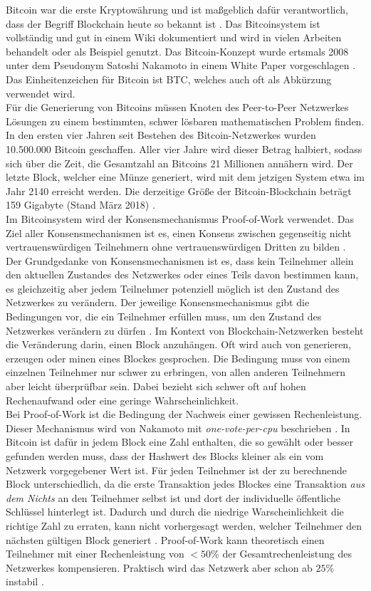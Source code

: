 		Bitcoin war die erste Kryptowährung und ist maßgeblich dafür verantwortlich, dass der Begriff Blockchain heute so bekannt ist \cite{BITB}. Das Bitcoinsystem ist vollständig und gut in einem Wiki \cite{BC-Wiki} dokumentiert und wird in vielen Arbeiten behandelt oder als Beispiel genutzt. 
		Das Bitcoin-Konzept wurde ertsmals 2008 unter dem Pseudonym Satoshi Nakamoto in einem White Paper vorgeschlagen \cite{BC}. Das Einheitenzeichen für Bitcoin ist BTC, welches auch oft als Abkürzung verwendet wird. \\
		Für die Generierung von Bitcoins müssen Knoten des Peer-to-Peer Netzwerkes Lösungen zu einem bestimmten, schwer lösbaren mathematischen Problem finden. In den ersten vier Jahren seit Bestehen des Bitcoin-Netzwerkes wurden 10.500.000 Bitcoin geschaffen. Aller vier Jahre wird dieser Betrag halbiert, sodass sich über die Zeit, die Gesamtzahl an Bitcoins 21 Millionen annähern wird. Der letzte Block, welcher eine Münze generiert, wird mit dem jetzigen System etwa im Jahr 2140 erreicht werden. Die derzeitige Größe der Bitcoin-Blockchain beträgt 159 Gigabyte (Stand März 2018) \cite{BCS} . \\
		Im Bitcoinsystem wird der Konsensmechanismus Proof-of-Work verwendet. Das Ziel aller Konsensmechanismen ist es, einen Konsens zwischen gegenseitig nicht vertrauenswürdigen Teilnehmern ohne vertrauenswürdigen Dritten zu bilden \cite{Block}. Der Grundgedanke von Konsensmechanismen ist es, dass kein Teilnehmer allein den aktuellen Zustandes des Netzwerkes oder eines Teils davon bestimmen kann, es gleichzeitig aber jedem Teilnehmer potenziell möglich ist den Zustand des Netzwerkes zu verändern. Der jeweilige Konsensmechanismus gibt die Bedingungen vor, die ein Teilnehmer erfüllen muss, um den Zustand des Netzwerkes verändern zu dürfen \cite{BITB}. Im Kontext von Blockchain-Netzwerken besteht die Veränderung darin, einen Block anzuhängen. Oft wird auch von generieren, erzeugen oder minen eines Blockes gesprochen.
		Die Bedingung muss von einem einzelnen Teilnehmer nur schwer zu erbringen, von allen anderen Teilnehmern aber leicht überprüfbar sein. Dabei bezieht sich schwer oft auf hohen Rechenaufwand oder eine geringe Wahrscheinlichkeit.\\ 
		Bei Proof-of-Work ist die Bedingung der Nachweis einer gewissen Rechenleistung. Dieser Mechanismus wird von Nakamoto mit \textit{one-vote-per-cpu} beschrieben \cite{PoW, BC}.
		In Bitcoin ist dafür in jedem Block eine Zahl enthalten, die so gewählt oder besser gefunden werden muss, dass der Hashwert des Blocks kleiner als ein vom Netzwerk vorgegebener Wert ist. Für jeden Teilnehmer ist der zu berechnende Block unterschiedlich, da die erste Transaktion jedes Blockes eine Transaktion \textit{aus dem Nichts} an den Teilnehmer selbst ist und dort der individuelle öffentliche Schlüssel hinterlegt ist. Dadurch und durch die niedrige Warscheinlichkeit die richtige Zahl zu erraten, kann nicht vorhergesagt werden, welcher Teilnehmer den nächsten gültigen Block generiert \cite{PoW}.
		Proof-of-Work kann theoretisch einen Teilnehmer mit einer Rechenleistung von \(<50\%\) der Gesamtrechenleistung des Netzwerkes kompensieren. Praktisch wird das Netzwerk aber schon ab \(25\%\) instabil \cite{CC}.
		
